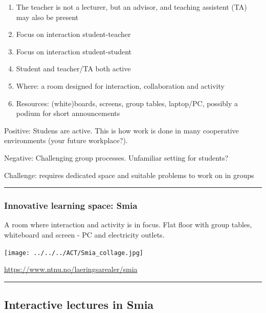 \documentclass[]{article}
\providecommand{\tightlist}{%
  \setlength{\itemsep}{0pt}\setlength{\parskip}{0pt}}
\begin{document}
\begin{enumerate}
\def\labelenumi{\arabic{enumi})}
\tightlist
\item
  The teacher is not a lecturer, but an advisor, and teaching assistent
  (TA) may also be present
\item
  Focus on interaction student-teacher
\item
  Focus on interaction student-student
\item
  Student and teacher/TA both active
\item
  Where: a room designed for interaction, collaboration and activity
\item
  Resources: (white)boards, screens, group tables, laptop/PC, possibly a
  podium for short announcements
\end{enumerate}

Positive: Studens are active. This is how work is done in many
cooperative environments (your future workplace?).

Negative: Challenging group processes. Unfamiliar setting for students?

Challenge: requires dedicated space and suitable problems to work on in
groups

\begin{center}\rule{0.5\linewidth}{\linethickness}\end{center}

\hypertarget{innovative-learning-space-smia}{%
\subsubsection{Innovative learning space:
Smia}\label{innovative-learning-space-smia}}

A room where interaction and activity is in focus. Flat floor with group
tables, whiteboard and screen - PC and electricity outlets.

\texttt{[image: ../../../ACT/Smia\_collage.jpg]}

\url{https://www.ntnu.no/laeringsarealer/smia}

\begin{center}\rule{0.5\linewidth}{\linethickness}\end{center}

\hypertarget{interactive-lectures-in-smia}{%
\subsection{Interactive lectures in
Smia}\label{interactive-lectures-in-smia}}
\end{document}
